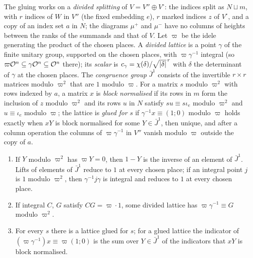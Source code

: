 The gluing works on a \emph{divided splitting} of $V=V''\oplus V^\circ$: the indices split as $N\sqcup m$, with $r$ indices of $W$ in $V''$ (the fixed embedding $e$), $r$ marked indices $z$ of $V^\circ$, and a copy of an index set $a$ in $N$; the diagrams $\mu^+$ and
$\mu^-$ have no columns of heights between the ranks of the summands and that of $V$. Let $\varpi$ be the idele generating the product of the chosen places. A \emph{divided lattice} is a point $\gamma$ of the finite unitary group, supported on the
chosen places, with $\varpi\gamma^{-1}$ integral (so $\varpi\mathcal{O}^n\subseteq\gamma\mathcal{O}^n\subseteq\mathcal{O}^n$ there); its \emph{scalar} is $c_\gamma=\chi(\delta)/\sqrt{\lvert \delta\rvert}^{\,r}$ with $\delta$ the determinant of $\gamma$ at the chosen places. The \emph{congruence group}
$\bar J^1$ consists of the invertible $r\times r$ matrices modulo $\varpi^2$ that are $1$ modulo $\varpi$. For a matrix $s$ modulo $\varpi^2$ with rows indexed by $a$, a matrix $x$ is \emph{block normalised} if its rows in $m$ form the inclusion of $z$ modulo
$\varpi^2$ and its rows $u$ in $N$ satisfy $su\equiv s\iota_e$ modulo $\varpi^2$ and $u\equiv\iota_e$ modulo $\varpi$; the lattice is \emph{glued for $s$} if $\gamma^{-1}x\equiv(1;0)$ modulo $\varpi$ holds exactly when $xY$ is block normalised for some $Y\in\bar J^1$, then
unique, and after a column operation the columns of $\varpi\gamma^{-1}$ in $V''$ vanish modulo $\varpi$ outside the copy of $a$.

\begin{lemma}\label{lem:glued-lattices}
\begin{enumerate}[label=\textup{(\alph*)}]
\item If $Y$ modulo $\varpi^2$ has $\varpi Y=0$, then $1-Y$ is the inverse of an element of $\bar J^1$. Lifts of elements of $\bar J^1$ reduce to $1$ at every chosen place; if an integral point $j$ is $1$ modulo $\varpi^2$, then $\gamma^{-1}j\gamma$ is integral and
reduces to $1$ at every chosen place.
\item If integral $C$, $G$ satisfy $CG=\varpi\cdot1$, some divided lattice has $\varpi\gamma^{-1}\equiv G$ modulo $\varpi^2$.
\item For every $s$ there is a lattice glued for $s$; for a glued lattice the indicator of $(\varpi\gamma^{-1})x\equiv\varpi(1;0)$ is the sum over $Y\in\bar J^1$ of the indicators that $xY$ is block normalised.
\end{enumerate}
\end{lemma}

